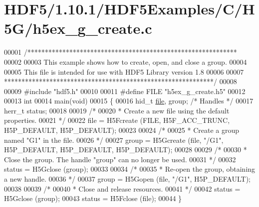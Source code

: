 \hypertarget{_h_d_f5_21_810_81_2_h_d_f5_examples_2_c_2_h5_g_2h5ex__g__create_8c_source}{}\section{H\+D\+F5/1.10.1/\+H\+D\+F5\+Examples/\+C/\+H5\+G/h5ex\+\_\+g\+\_\+create.c}
\label{_h_d_f5_21_810_81_2_h_d_f5_examples_2_c_2_h5_g_2h5ex__g__create_8c_source}

\begin{DoxyCode}
00001 \textcolor{comment}{/************************************************************}
00002 \textcolor{comment}{}
00003 \textcolor{comment}{  This example shows how to create, open, and close a group.}
00004 \textcolor{comment}{}
00005 \textcolor{comment}{  This file is intended for use with HDF5 Library version 1.8}
00006 \textcolor{comment}{}
00007 \textcolor{comment}{ ************************************************************/}
00008 
00009 \textcolor{preprocessor}{#include "hdf5.h"}
00010 
00011 \textcolor{preprocessor}{#define FILE "h5ex\_g\_create.h5"}
00012 
00013 \textcolor{keywordtype}{int}
00014 main(\textcolor{keywordtype}{void})
00015 \{
00016     hid\_t       \hyperlink{structfile}{file}, group;         \textcolor{comment}{/* Handles */}
00017     herr\_t      status;
00018 
00019     \textcolor{comment}{/*}
00020 \textcolor{comment}{     * Create a new file using the default properties.}
00021 \textcolor{comment}{     */}
00022     file = H5Fcreate (FILE, H5F\_ACC\_TRUNC, H5P\_DEFAULT, H5P\_DEFAULT);
00023 
00024     \textcolor{comment}{/*}
00025 \textcolor{comment}{     * Create a group named "G1" in the file.}
00026 \textcolor{comment}{     */}
00027     group = H5Gcreate (file, \textcolor{stringliteral}{"/G1"}, H5P\_DEFAULT, H5P\_DEFAULT, H5P\_DEFAULT);
00028 
00029     \textcolor{comment}{/*}
00030 \textcolor{comment}{     * Close the group.  The handle "group" can no longer be used.}
00031 \textcolor{comment}{     */}
00032     status = H5Gclose (group);
00033 
00034     \textcolor{comment}{/*}
00035 \textcolor{comment}{     * Re-open the group, obtaining a new handle.}
00036 \textcolor{comment}{     */}
00037     group = H5Gopen (file, \textcolor{stringliteral}{"/G1"}, H5P\_DEFAULT);
00038 
00039     \textcolor{comment}{/*}
00040 \textcolor{comment}{     * Close and release resources.}
00041 \textcolor{comment}{     */}
00042     status = H5Gclose (group);
00043     status = H5Fclose (file);
00044 \}
\end{DoxyCode}
